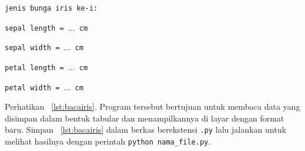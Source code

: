 \texttt{jenis bunga iris ke-i:}

\texttt{sepal length = $\ldots$ cm}

\texttt{sepal width = $\ldots$ cm}

\texttt{petal length = $\ldots$ cm}

\texttt{petal width = $\ldots$ cm}


Perhatikan \lstlistingname~\ref{lst:bacairis}. Program tersebut bertujuan untuk membaca data yang disimpan dalam bentuk tabular dan menampilkannya di layar dengan format baru. Simpan \lstlistingname~\ref{lst:bacairis} dalam berkas berekstensi \texttt{.py} lalu jalankan untuk melihat hasilnya dengan perintah \texttt{python nama\_file.py}.



